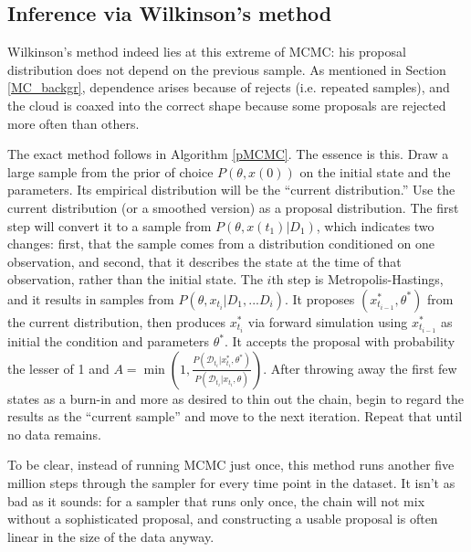 \documentclass{article}
\begin{document}
\subsection{Inference via Wilkinson's method}
Wilkinson's method indeed lies at this extreme of MCMC: his proposal distribution does not depend on the previous sample. As mentioned in Section \ref{MC_backgr}, dependence arises because of rejects (i.e. repeated samples), and the cloud is coaxed into the correct shape because some proposals are rejected more often than others. 

The exact method follows in Algorithm \ref{pMCMC}. The essence is this. Draw a large sample from the prior of choice $P(\theta, x(0))$ on the initial state and the parameters. Its empirical distribution will be the ``current distribution.'' Use the current distribution (or a smoothed version) as a proposal distribution. The first step will convert it to a sample from $P(\theta, x(t_1)|D_1)$, which indicates two changes: first, that the sample comes from a distribution conditioned on one observation, and second, that it describes the state at the time of that observation, rather than the initial state. The $i$th step is Metropolis-Hastings, and it results in samples from $P(\theta, x_{t_i}|D_{1}, ...D_{i})$. It proposes $(x_{t_{i-1}}^*, \theta^*)$ from the current distribution, then produces $x_{t_{i}}^*$ via forward simulation using $x_{t_{i-1}}^*$ as initial the condition and parameters $\theta^*$. It accepts the proposal with probability the lesser of 1 and $A=\min(1, \frac{P(\mathcal{D}_{t_{i}}|x_{t_{i}}^*, \theta^*)}{P(\mathcal{D}_{t_{i}}|x_{t_{i}}, \theta)})$. After throwing away the first few states as a burn-in and more as desired to thin out the chain, begin to regard the results as the ``current sample'' and move to the next iteration. Repeat that until no data remains.

To be clear, instead of running MCMC just once, this method runs another five million steps through the sampler for every time point in the dataset. It isn’t as bad as it sounds: for a sampler that runs only once, the chain will not mix without a sophisticated proposal, and constructing a usable proposal is often linear in the size of the data anyway.
\end{document}

